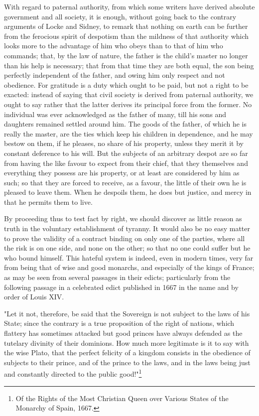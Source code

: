 \documentclass[12pt]{report}
\begin{document}
With regard to paternal authority, from which some writers have derived absolute government and all society, it is enough, without going back to the contrary arguments of Locke and Sidney, to remark that nothing on earth can be further from the ferocious spirit of despotism than the mildness of that authority which looks more to the advantage of him who obeys than to that of him who commands; that, by the law of nature, the father is the child's master no longer than his help is necessary; that from that time they are both equal, the son being perfectly independent of the father, and owing him only respect and not obedience. For gratitude is a duty which ought to be paid, but not a right to be exacted: instead of saying that civil society is derived from paternal authority, we ought to say rather that the latter derives its principal force from the former. No individual was ever acknowledged as the father of many, till his sons and daughters remained settled around him. The goods of the father, of which he is really the master, are the ties which keep his children in dependence, and he may bestow on them, if he pleases, no share of his property, unless they merit it by constant deference to his will. But the subjects of an arbitrary despot are so far from having the like favour to expect from their chief, that they themselves and everything they possess are his property, or at least are considered by him as such; so that they are forced to receive, as a favour, the little of their own he is pleased to leave them. When he despoils them, he does but justice, and mercy in that he permits them to live.

By proceeding thus to test fact by right, we should discover as little reason as truth in the voluntary establishment of tyranny. It would also be no easy matter to prove the validity of a contract binding on only one of the parties, where all the risk is on one side, and none on the other; so that no one could suffer but he who bound himself. This hateful system is indeed, even in modern times, very far from being that of wise and good monarchs, and especially of the kings of France; as may be seen from several passages in their edicts; particularly from the following passage in a celebrated edict published in 1667 in the name and by order of Louis XIV.

"Let it not, therefore, be said that the Sovereign is not subject to the laws of his State; since the contrary is a true proposition of the right of nations, which flattery has sometimes attacked but good princes have always defended as the tutelary divinity of their dominions. How much more legitimate is it to say with the wise Plato, that the perfect felicity of a kingdom consists in the obedience of subjects to their prince, and of the prince to the laws, and in the laws being just and constantly directed to the public good!"\footnote{Of the Rights of the Most Christian Queen over Various States of the Monarchy of Spain, 1667.}
\end{document}
